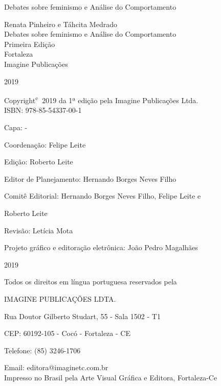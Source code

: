 \documentclass[hidelinks, 4pt]{bookest}
\let\orignewcommand\newcommand  %
\let\newcommand\providecommand  %
\let\newcommand\orignewcommand  %
\newcommand\blankpage{%
    \null
    \thispagestyle{empty}%
    \addtocounter{page}{-1}%
    \newpage}
\begin{document}
%
\begin{titlepage}
    \vspace*{\fill}
    \begin{center}
        {\Huge Debates sobre feminismo e Análise do Comportamento}
    \end{center}
    \vspace*{\fill}
    \pagestyle{empty}
    \afterpage{\null\newpage}
    \blankpage
\begin{center}
    \vfill
\end{center}
\begin{center}
{\Large Renata Pinheiro e Táhcita Medrado }\\[4cm]
{\Huge Debates sobre feminismo e Análise do Comportamento}\\[4cm]

{\Large Primeira Edição}\\[3cm]


{\large Fortaleza\\
Imagine Publicações}

2019
\pagebreak
\thispagestyle{empty}
\end{center}
\pagebreak

Copyright\textsuperscript{\textcircled{c}} 2019 da 1ª edição pela Imagine Publicações Ltda.\\

ISBN: 978-85-54337-00-1

Capa: -

Coordenação: Felipe Leite

Edição: Roberto Leite

Editor de Planejamento: Hernando Borges Neves Filho

Comitê Editorial: Hernando Borges Neves Filho, Felipe Leite e

Roberto Leite

Revisão: Letícia Mota

Projeto gráfico e editoração eletrônica: João Pedro Magalhães\\
\vfill
\begin{center}
\end{center}

2019

Todos os direitos em língua portuguesa reservados pela

IMAGINE PUBLICAÇÕES LDTA.

Rua Doutor Gilberto Studart, 55 - Sala 1502 - T1

CEP: 60192-105 - Cocó - Fortaleza - CE

Telefone: (85) 3246-1706

Email: editora@imaginetc.com.br\\

Impresso no Brasil pela Arte Visual Gráfica e Editora, Fortaleza-Ce
\thispagestyle{empty}
\end{titlepage}
\end{document}
